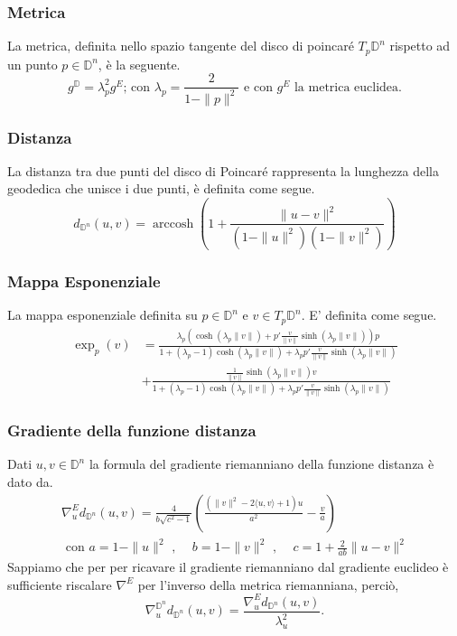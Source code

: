 \documentclass[a4paper, 12pt]{article}
\DeclareMathOperator\arccosh{arccosh}
\begin{document}
\subsubsection{Metrica}
La metrica, definita nello spazio tangente del disco di poincaré $T_p\mathbb{D}^n$ rispetto ad un punto $p \in \mathbb{D}^n$, è la seguente.\\
\[g^\mathbb{D} = \lambda_p^2 g^E \mbox{; con } \lambda_p = \frac{2}{1- \| p \|^2} \mbox{ e con } g^E \mbox{ la metrica euclidea}.\]
\subsubsection{Distanza}
La distanza tra due punti del disco di Poincaré rappresenta la lunghezza della geodedica che unisce i due punti, è definita come segue.\\
\[d_{\mathbb{D}^n}(u, v) = \arccosh \left(1 + \frac{\| u - v\|^2}{(1-\| u \|^2)(1-\| v \|^2)} \right)\]
\subsubsection{Mappa Esponenziale}
La mappa esponenziale definita su $p \in \mathbb{D}^n$ e $v \in T_p\mathbb{D}^n$. E' definita come segue.\\
\begin{equation*}\begin{split}
\exp_p(v) &= \frac{\lambda_p (\cosh(\lambda_p \| v \|) + p'\frac{v}{\| v \|} \sinh(\lambda_p \| v \|))p}{1 + (\lambda_p - 1) \cosh(\lambda_p \| v \|) + \lambda_p p ' \frac{v}{\| v \|} \sinh(\lambda_p \| v \|)} \\
&+ \frac{\frac{1}{\| v \|} \sinh(\lambda_p \| v \|) v}{1 + (\lambda_p - 1) \cosh(\lambda_p \| v \|) + \lambda_p p' \frac{v}{\| v \|} \sinh(\lambda_p \| v \|)}
\end{split}\end{equation*}
\subsubsection{Gradiente della funzione distanza}
Dati $u,v \in \mathbb{D}^n$ la formula del gradiente riemanniano della funzione distanza è dato da.\\
\begin{equation*}\begin{gathered}
\nabla_u^{E} d_{\mathbb{D}^n}(u,v) = \frac{4}{b \sqrt{c^2 - 1}} \left(\frac{(\| v \|^2 - 2\langle u,v \rangle + 1)u}{a^2} - \frac{v}{a}\right) \\ \mbox{ con } a = 1 - \| u \|^2 \mbox{ , } \quad b = 1 - \| v \|^2 \mbox{ , } \quad c = 1 + \frac{2}{ab} \| u - v \|^2
\end{gathered}\end{equation*}
Sappiamo che per per ricavare il gradiente riemanniano dal gradiente euclideo è sufficiente riscalare $\nabla^E$ per l'inverso della metrica riemanniana, perciò,\\ \[\nabla_u^{\mathbb{D}^n} d_{\mathbb{D}^n}(u,v) = \frac{\nabla_u^{E} d_{\mathbb{D}^n}(u,v)}{\lambda_u^2}.\]
\end{document}
